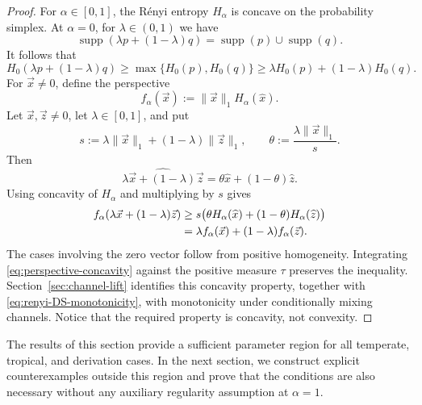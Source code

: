 \documentclass[aps,pra,11pt,onecolumn,nofootinbib,tightenlines]{revtex4-2}
\theoremstyle{definition}
\begin{document}
\begin{proof}
For $\alpha\in[0,1]$, the R\'enyi entropy $H_\alpha$ is concave on the probability simplex. At $\alpha=0$, for $\lambda\in(0,1)$ we have
\begin{equation}
 \operatorname{supp}(\lambda p+(1-\lambda)q)
 =\operatorname{supp}(p)\cup\operatorname{supp}(q).
 \label{eq:support-union}
\end{equation}
It follows that
\begin{equation}
 H_0(\lambda p+(1-\lambda)q)
 \geq\max\{H_0(p),H_0(q)\}
 \geq\lambda H_0(p)+(1-\lambda)H_0(q).
 \label{eq:H0-concavity}
\end{equation}
For $\vec x\neq0$, define the perspective
\begin{equation}
 f_\alpha(\vec x)
 :=\|\vec x\|_1H_\alpha(\widehat x).
 \label{eq:renyi-perspective}
\end{equation}
Let $\vec x,\vec z\neq0$, let $\lambda\in[0,1]$, and put
\begin{equation}
 s:=\lambda\|\vec x\|_1+(1-\lambda)\|\vec z\|_1,
 \qquad
 \theta:=\frac{\lambda\|\vec x\|_1}{s}.
 \label{eq:perspective-theta}
\end{equation}
Then
\begin{equation}
 \widehat{\lambda\vec x+(1-\lambda)\vec z}
 =\theta\widehat x+(1-\theta)\widehat z.
 \label{eq:normalised-mixture}
\end{equation}
Using concavity of $H_\alpha$ and multiplying by $s$ gives
\begin{align}
 f_\alpha(\lambda\vec x+(1-\lambda)\vec z)
 &\geq
 s\bigl(\theta H_\alpha(\widehat x)
 +(1-\theta)H_\alpha(\widehat z)\bigr)\notag\\
 &=\lambda f_\alpha(\vec x)
 +(1-\lambda)f_\alpha(\vec z).
 \label{eq:perspective-concavity}
\end{align}
The cases involving the zero vector follow from positive homogeneity. Integrating \eqref{eq:perspective-concavity} against the positive measure $\tau$ preserves the inequality. Section~\ref{sec:channel-lift} identifies this concavity property, together with \eqref{eq:renyi-DS-monotonicity}, with monotonicity under conditionally mixing channels. Notice that the required property is concavity, not convexity.
\end{proof}

The results of this section provide a sufficient parameter region for all temperate, tropical, and derivation cases. In the next section, we construct explicit counterexamples outside this region and prove that the conditions are also necessary without any auxiliary regularity assumption at $\alpha=1$.
\end{document}
